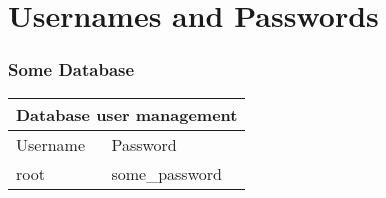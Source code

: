 \section{Usernames and Passwords}

\subsubsection{Some Database}
\begin{table}[H]
    \begin{tabular}{|p{10em}|p{20em}|}
        \hline
        \multicolumn{2}{|c|}{\textbf{Database user management}} \\
        \hline
        Username & Password \\
        \hline\hline
        root & some\_password \\ \hline
        \hline
    \end{tabular}
\end{table}
